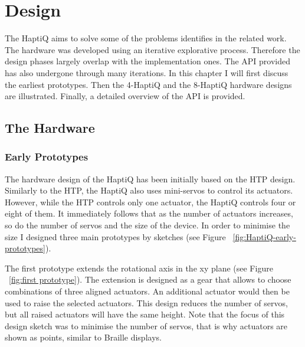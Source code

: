 \chapter{Design}

The HaptiQ aims to solve some of the problems identifies in the related work. The hardware was developed using an iterative explorative process. Therefore the design phases largely overlap with the implementation ones. The API provided has also undergone through many iterations. In this chapter I will first discuss the earliest prototypes. Then the 4-HaptiQ and the 8-HaptiQ hardware designs are illustrated. Finally, a detailed overview of the API is provided.

\section{The Hardware}
\subsection{Early Prototypes}
The hardware design of the HaptiQ has been initially based on the HTP design. Similarly to the HTP, the HaptiQ also uses mini-servos to control its actuators. However, while the HTP controls only one actuator, the HaptiQ controls four or eight of them. It immediately follows that as the number of actuators increases, so do the number of servos and the size of the device. In order to minimise the size I designed three main prototypes by sketches (see Figure ~\ref{fig:HaptiQ-early-prototypes}). 

The first prototype extends the rotational axis in the xy plane (see Figure ~\ref{fig:first prototype}). The extension is designed as a gear that allows to choose combinations of three aligned actuators. An additional actuator would then be used to raise the selected actuators. This design reduces the number of servos, but all raised actuators will have the same height. Note that the focus of this design sketch was to minimise the number of servos, that is why actuators are shown as points, similar to Braille displays.

